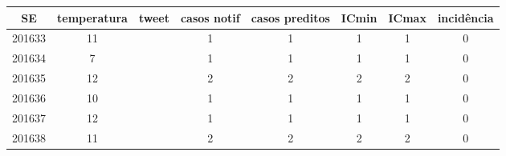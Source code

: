 \begin{tabular}{c|ccccccc}
  \hline
SE & temperatura & tweet & casos notif & casos preditos & ICmin & ICmax & incidência \\ 
  \hline
201633 & 11 &  & 1 & 1 & 1 & 1 & 0 \\ 
  201634 & 7 &  & 1 & 1 & 1 & 1 & 0 \\ 
  201635 & 12 &  & 2 & 2 & 2 & 2 & 0 \\ 
  201636 & 10 &  & 1 & 1 & 1 & 1 & 0 \\ 
  201637 & 12 &  & 1 & 1 & 1 & 1 & 0 \\ 
  201638 & 11 &  & 2 & 2 & 2 & 2 & 0 \\ 
   \hline
\end{tabular}

